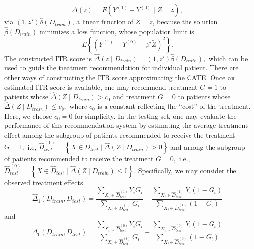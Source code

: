 \documentclass[12pt]{article}
\begin{document}
$$\Delta(z)=E\left(Y^{(1)}-Y^{(0)} \mid Z=z\right),$$ via 
 $(1, z')\hat{\beta}(D_{train})$, a linear function of $Z=z$, because the solution $\widehat{\beta}(D_{train})$ minimizes a loss function, whose population limit is 
$$ E\left\{\left(Y^{(1)}-Y^{(0)}-\beta'\tilde{Z} \right)^2\right\}.$$
 The constructed ITR score is $\widehat{\Delta}(z\mid D_{train})=(1, z')\hat{\beta}(D_{train}),$ which can be used to guide the treatment recommendation for individual patient.  There are other ways of constructing the ITR score approximating the CATE.  Once an estimated ITR score is available, one may recommend treatment $G=1$ to patients whose $\widehat{\Delta}(Z\mid D_{train})>c_0$ and treatment $G=0$ to patients whose $\widehat{\Delta}(Z\mid D_{train})\le c_0,$ where $c_0$ is a constant reflecting the ``cost'' of the treatment. Here, we choose $c_0=0$ for simplicity.  In the testing set, one may evaluate the performance of this recommendation system by estimating the average treatment effect among the subgroup of patients recommended to receive the treatment $G=1,$ i.e, $\widehat{D}_{test}^{(1)}=\left\{X \in D_{test} \mid \widehat{\Delta}(Z\mid D_{train})>0\right\}$ and among the subgroup of patients recommended to receive the treatment $G=0,$ i.e., $\widehat{D}_{test}^{(0)}=\left\{X \in \widehat{D}_{test} \mid \widehat{\Delta}(Z\mid D_{train})\le 0\right\}.$  Specifically, we may consider the observed treatment effects
$$ \widehat{\Delta}_1(D_{train},D_{test})= \frac{\sum_{X_i\in \hat{D}_{test}^{(1)}}Y_iG_i}{\sum_{X_i\in \hat{D}_{test}^{(1)}} G_i}-\frac{\sum_{X_i\in \hat{D}_{test}^{(1)}}Y_i(1-G_i)}{\sum_{X_i\in \hat{D}_{test}^{(1)}} (1-G_i)}$$
and
$$ \widehat{\Delta}_0(D_{train},D_{test})= \frac{\sum_{X_i\in \hat{D}_{test}^{(0)}}Y_iG_i}{\sum_{X_i\in \hat{D}_{test}^{(0)}} G_i}-\frac{\sum_{X_i\in \hat{D}_{test}^{(0)}}Y_i(1-G_i)}{\sum_{X_i\in \hat{D}_{test}^{(0)}} (1-G_i)}$$
\end{document}
